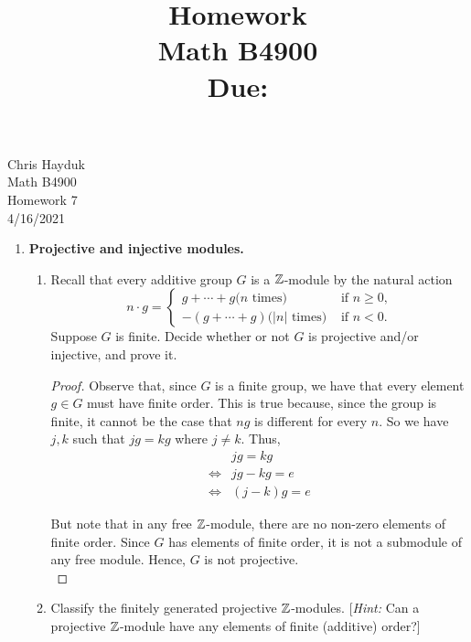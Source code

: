 \documentclass[11pt, reqno]{amsart}
\title[Homework \HW]{Homework \HW \\
Math B4900\\
\small Due: \DUE}
\author{}
\date{}                                           %
\theoremstyle{plain}
\theoremstyle{definition}
\theoremstyle{example}
\def\HW{7}
\def\DUE{4/16/2021}
\begin{document}
\begin{flushright}
Chris Hayduk\\
Math B4900\\
Homework \HW\\
\DUE
\end{flushright}


\begin{enumerate}[1.]
\item \textbf{Projective and injective modules.} 
\begin{enumerate}
\item Recall that every additive group $G$ is a $\mathbb{Z}$-module by the natural action 
$$n \cdot g = \begin{cases} g + \cdots + g \text{($n$ times)} & \text{ if $n \ge 0$,}\\
			-(g + \cdots + g) \text{($|n|$ times)} & \text{ if $n < 0$.}\end{cases}$$
Suppose $G$ is finite. Decide whether or not $G$ is projective and/or injective, and prove it.

\begin{proof}
Observe that, since $G$ is a finite group, we have that every element $g \in G$ must have finite order. This is true because, since the group is finite, it cannot be the case that $ng$ is different for every $n$. So we have $j, k$ such that $jg = kg$ where $j \neq k$. Thus,
\begin{align*}
&jg = kg\\
\iff &jg - kg = e\\
\iff &(j - k)g = e
\end{align*}

But note that in any free $\mathbb{Z}$-module, there are no non-zero elements of finite order. Since $G$ has elements of finite order, it is not a submodule of any free module. Hence, $G$ is not projective.\\


\end{proof}

\item Classify the finitely generated projective $\mathbb{Z}$-modules. {[\emph{Hint:} Can a projective $\mathbb{Z}$-module have any elements of finite (additive) order?]}
\end{enumerate}


\end{enumerate}
\end{document}
